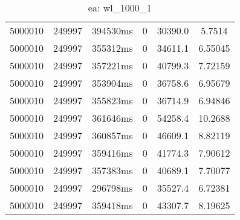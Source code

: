 \documentclass[./main.tex]{subfiles}
\begin{document}
\begin{table}
\begin{tabular}{ c | c | c | c | c | c }
        \hline
        5000010 & 249997 & 394530ms & 0 & 30390.0 & 5.7514 \\
        5000010 & 249997 & 355312ms & 0 & 34611.1 & 6.55045 \\
        5000010 & 249997 & 357221ms & 0 & 40799.3 & 7.72159 \\
        5000010 & 249997 & 353904ms & 0 & 36758.6 & 6.95679 \\
        5000010 & 249997 & 355823ms & 0 & 36714.9 & 6.94846 \\
        5000010 & 249997 & 361646ms & 0 & 54258.4 & 10.2688 \\
        5000010 & 249997 & 360857ms & 0 & 46609.1 & 8.82119 \\
        5000010 & 249997 & 359416ms & 0 & 41774.3 & 7.90612 \\
        \rowcolor{lightgray} 5000010 & 249997 & 357383ms & 0 & 40689.1 & 7.70077 \\
        5000010 & 249997 & 296798ms & 0 & 35527.4 & 6.72381 \\
        5000010 & 249997 & 359418ms & 0 & 43307.7 & 8.19625 \\
    \end{tabular}
    \caption{ea: wl\_1000\_1}
\end{table}
\end{document}
